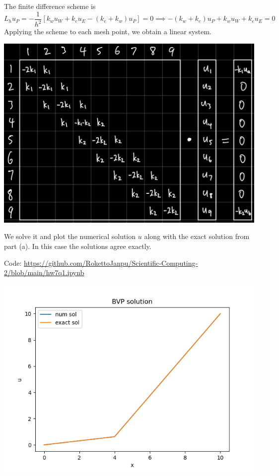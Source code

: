 \documentclass{article}
\newcommand{\sbr}[1]{\left[#1\right]}
\newcommand{\imp}{\implies}
\newcommand{\sep}[1][.5cm]{\vspace{#1}}
\begin{document}
\begin{enumerate}[label=(\alph*)]
The finite difference scheme is
$$L_hu_P = -\frac{1}{h^2}\sbr{k_wu_W + k_eu_E - (k_e + k_w)u_P} = 0
\imp -(k_w + k_e)u_P + k_wu_W + k_eu_E = 0$$
Applying the scheme to each mesh point, we obtain a linear system.
\begin{center}
	\includegraphics[scale=.1]{hw7 q1 full}
\end{center}

We solve it and plot the numerical solution $u$ along with the exact solution from part (a). In this case the solutions agree exactly.

Code: \url{https://github.com/RokettoJanpu/Scientific-Computing-2/blob/main/hw7q1.ipynb}
\begin{center}
	\includegraphics[scale=.5]{hw7 q1 plot}
\end{center}

\end{enumerate}
\sep
\end{document}
